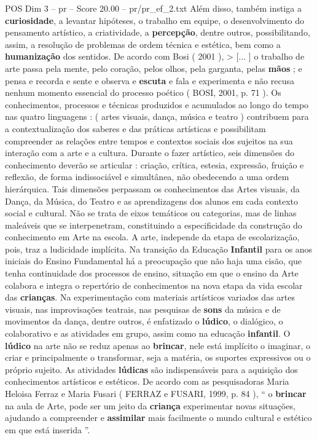 \begin{textsample}{POS Dim 3 – pr – Score 20.00 – pr/pr\_ef\_2.txt}
Além disso, também instiga a \textbf{curiosidade}, a levantar hipóteses, o trabalho em equipe, o desenvolvimento do pensamento artístico, a criatividade, a \textbf{percepção}, dentre outros, possibilitando, assim, a resolução de problemas de ordem técnica e estética, bem como a \textbf{humanização} dos sentidos.
De acordo com Bosi ( 2001 ), > [... ] o trabalho de arte passa pela mente, pelo coração, pelos olhos, pela garganta, pelas \textbf{mãos} ; e pensa e recorda e sente e observa e \textbf{escuta} e fala e experimenta e não recusa nenhum momento essencial do processo poético ( BOSI, 2001, p. 71 ).
Os conhecimentos, processos e técnicas produzidos e acumulados ao longo do tempo nas quatro linguagens : ( artes visuais, dança, música e teatro ) contribuem para a contextualização dos saberes e das práticas artísticas e possibilitam compreender as relações entre tempos e contextos sociais dos sujeitos na sua interação com a arte e a cultura.
Durante o fazer artístico, seis dimensões do conhecimento deverão se articular : criação, crítica, estesia, expressão, fruição e reflexão, de forma indissociável e simultânea, não obedecendo a uma ordem hierárquica.
Tais dimensões perpassam os conhecimentos das Artes visuais, da Dança, da Música, do Teatro e as aprendizagens dos alunos em cada contexto social e cultural.
Não se trata de eixos temáticos ou categorias, mas de linhas maleáveis que se interpenetram, constituindo a especificidade da construção do conhecimento em Arte na escola.
A arte, independe da etapa de escolarização, pois, traz a ludicidade implícita.
Na transição da Educação \textbf{Infantil} para os anos iniciais do Ensino Fundamental há a preocupação que não haja uma cisão, que tenha continuidade dos processos de ensino, situação em que o ensino da Arte colabora e integra o repertório de conhecimentos na nova etapa da vida escolar das \textbf{crianças}.
Na experimentação com materiais artísticos variados das artes visuais, nas improvisações teatrais, nas pesquisas de \textbf{sons} da música e de movimentos da dança, dentre outros, é enfatizado o \textbf{lúdico}, o dialógico, o colaborativo e as atividades em grupo, assim como na educação \textbf{infantil}.
O \textbf{lúdico} na arte não se reduz apenas ao \textbf{brincar}, nele está implícito o imaginar, o criar e principalmente o transformar, seja a matéria, os suportes expressivos ou o próprio sujeito.
As atividades \textbf{lúdicas} são indispensáveis para a aquisição dos conhecimentos artísticos e estéticos.
De acordo com as pesquisadoras Maria Heloisa Ferraz e Maria Fusari ( FERRAZ e FUSARI, 1999, p. 84 ), “ o \textbf{brincar} na aula de Arte, pode ser um jeito da \textbf{criança} experimentar novas situações, ajudando a compreender e \textbf{assimilar} mais facilmente o mundo cultural e estético em que está inserida ”.

\end{textsample}
